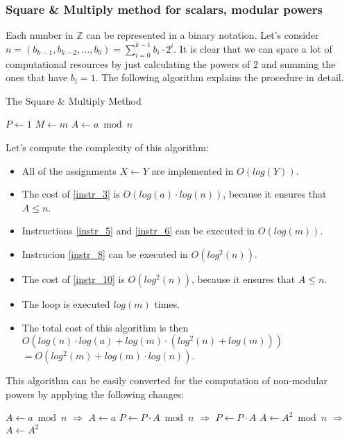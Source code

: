 \subsubsection{Square \& Multiply method for scalars, modular powers}
Each number in $\mathbb{Z}$ can be represented in a binary notation. \newline
Let's consider $n = (b_{k-1}, b_{k-2}, \dots, b_{0}) = \sum_{i=0}^{k-1} b_{i} \cdot 2^{i}$. \newline
It is clear that we can spare a lot of computational resources by just calculating the powers of 2 and summing the ones that have $b_{i} = 1$. The following algorithm explains the procedure in detail.
\begin{algorithm}
\caption{The Square \& Multiply Method}\label{alg:SquareMultiply}
$P \gets 1$\;
$M \gets m$\;
$A \gets a \bmod n$\;\label{instr_3}
\end{algorithm}
Let's compute the complexity of this algorithm:
\begin{itemize}
    \item All of the assignments $X \gets Y$ are implemented in $O(log(Y))$.
    \item The cost of \ref{instr_3} is $O(log(a) \cdot log(n))$, because it ensures that $A \leq n$.
    \item Instructions \ref{instr_5} and \ref{instr_6} can be executed in $O(log(m))$.
    \item Instrucion \ref{instr_8} can be executed in $O(log^{2}(n))$.
    \item The cost of \ref{instr_10} is $O(log^{2}(n))$, because it ensures that $A \leq n$.
    \item The loop is executed $log(m)$ times.
    \item The total cost of this algorithm is then $O(log(n) \cdot log(a) + log(m) \cdot (log^{2}(n) + log(m)))$ \\ $= O(log^{2}(m) + log(m) \cdot log(n))$.
\end{itemize}
This algorithm can be easily converted for the computation of non-modular powers by applying the following changes:
\begin{algorithm}
    $A \gets a \bmod n$ $\Longrightarrow$ $A \gets a$\;\label{instr_3a}
    $P \gets P \cdot A \bmod n$ $\Longrightarrow$ $P \gets P \cdot A$\;\label{instr_8a}
    $A \gets A^{2} \bmod n$ $\Longrightarrow$ $A \gets A^{2}$\;\label{instr_10a}
\end{algorithm}
